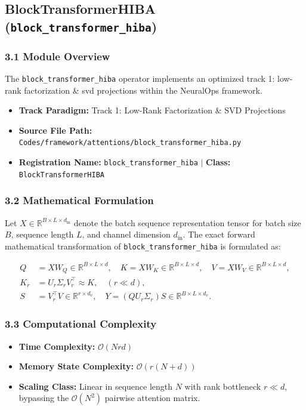 \subsection{BlockTransformerHIBA (\texttt{block\_transformer\_hiba})}
\label{sec:app_module_block\_transformer\_hiba}

\subsubsection*{3.1 Module Overview}
The \texttt{block\_transformer\_hiba} operator implements an optimized track 1: low-rank factorization \& svd projections within the NeuralOps framework.
\begin{itemize}
    \item \textbf{Track Paradigm:} Track 1: Low-Rank Factorization & SVD Projections
    \item \textbf{Source File Path:} \texttt{Codes/framework/attentions/block\_transformer\_hiba.py}
    \item \textbf{Registration Name:} \texttt{block\_transformer\_hiba} $\mid$ \textbf{Class:} \texttt{BlockTransformerHIBA}
\end{itemize}

\subsubsection*{3.2 Mathematical Formulation}
Let $X \in \mathbb{R}^{B \times L \times d_{\text{in}}}$ denote the batch sequence representation tensor for batch size $B$, sequence length $L$, and channel dimension $d_{\text{in}}$. The exact forward mathematical transformation of \texttt{block\_transformer\_hiba} is formulated as:

\begin{align}
Q &= X W_Q \in \mathbb{R}^{B \times L \times d}, \quad K = X W_K \in \mathbb{R}^{B \times L \times d}, \quad V = X W_V \in \mathbb{R}^{B \times L \times d}, \\
K_r &= U_r \Sigma_r V_r^\top \approx K, \quad (r \ll d), \\
S &= V_r^\top V \in \mathbb{R}^{r \times d_v}, \quad Y = (Q U_r \Sigma_r) S \in \mathbb{R}^{B \times L \times d_v}.
\end{align}


\subsubsection*{3.3 Computational Complexity}
\begin{itemize}
    \item \textbf{Time Complexity:} $\mathcal{O}(N r d)$
    \item \textbf{Memory State Complexity:} $\mathcal{O}(r(N + d))$
    \item \textbf{Scaling Class:} Linear in sequence length $N$ with rank bottleneck $r \ll d$, bypassing the $\mathcal{O}(N^2)$ pairwise attention matrix.
\end{itemize}

